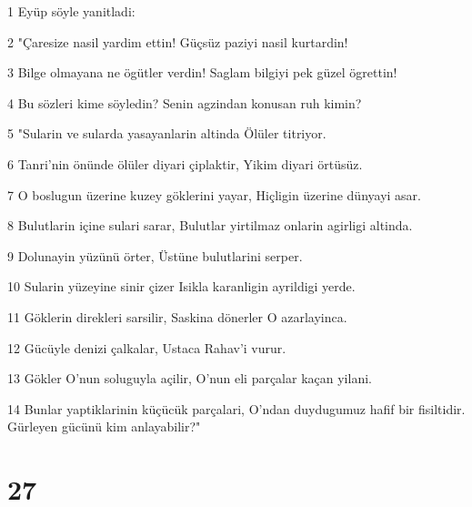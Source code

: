 \par 1 Eyüp söyle yanitladi:
\par 2 "Çaresize nasil yardim ettin! Güçsüz paziyi nasil kurtardin!
\par 3 Bilge olmayana ne ögütler verdin! Saglam bilgiyi pek güzel ögrettin!
\par 4 Bu sözleri kime söyledin? Senin agzindan konusan ruh kimin?
\par 5 "Sularin ve sularda yasayanlarin altinda Ölüler titriyor.
\par 6 Tanri'nin önünde ölüler diyari çiplaktir, Yikim diyari örtüsüz.
\par 7 O boslugun üzerine kuzey göklerini yayar, Hiçligin üzerine dünyayi asar.
\par 8 Bulutlarin içine sulari sarar, Bulutlar yirtilmaz onlarin agirligi altinda.
\par 9 Dolunayin yüzünü örter, Üstüne bulutlarini serper.
\par 10 Sularin yüzeyine sinir çizer Isikla karanligin ayrildigi yerde.
\par 11 Göklerin direkleri sarsilir, Saskina dönerler O azarlayinca.
\par 12 Gücüyle denizi çalkalar, Ustaca Rahav'i vurur.
\par 13 Gökler O'nun soluguyla açilir, O'nun eli parçalar kaçan yilani.
\par 14 Bunlar yaptiklarinin küçücük parçalari, O'ndan duydugumuz hafif bir fisiltidir. Gürleyen gücünü kim anlayabilir?"

\chapter{27}

